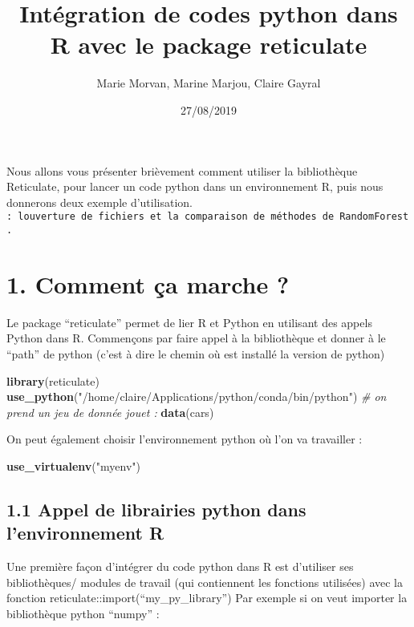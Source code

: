\documentclass[]{article}
\title{Intégration de codes python dans R avec le package reticulate}
\author{Marie Morvan, Marine Marjou, Claire Gayral}
\date{27/08/2019}
\newenvironment{Shaded}{\begin{snugshade}}{\end{snugshade}}
\newcommand{\CommentTok}[1]{\textcolor[rgb]{0.56,0.35,0.01}{\textit{#1}}}
\newcommand{\KeywordTok}[1]{\textcolor[rgb]{0.13,0.29,0.53}{\textbf{#1}}}
\newcommand{\NormalTok}[1]{#1}
\newcommand{\StringTok}[1]{\textcolor[rgb]{0.31,0.60,0.02}{#1}}
\begin{document}
\maketitle

Nous allons vous présenter brièvement comment utiliser la bibliothèque
Reticulate, pour lancer un code python dans un environnement R, puis
nous donnerons deux exemple d'utilisation.
\texttt{:\ l\textquotesingle{}ouverture\ de\ fichiers\ et\ la\ comparaison\ de\ méthodes\ de\ RandomForest.}

\hypertarget{comment-ca-marche}{%
\section{1. Comment ça marche ?}\label{comment-ca-marche}}

Le package ``reticulate'' permet de lier R et Python en utilisant des
appels Python dans R. Commençons par faire appel à la bibliothèque et
donner à le ``path'' de python (c'est à dire le chemin où est installé
la version de python)

\begin{Shaded}
\begin{Highlighting}[]
\KeywordTok{library}\NormalTok{(reticulate)}
\KeywordTok{use\_python}\NormalTok{(}\StringTok{"/home/claire/Applications/python/conda/bin/python"}\NormalTok{)}
\CommentTok{\# on prend un jeu de donnée jouet : }
\KeywordTok{data}\NormalTok{(cars)}
\end{Highlighting}
\end{Shaded}

On peut également choisir l'environnement python où l'on va travailler :

\begin{Shaded}
\begin{Highlighting}[]
\KeywordTok{use\_virtualenv}\NormalTok{(}\StringTok{"myenv"}\NormalTok{)}
\end{Highlighting}
\end{Shaded}

\hypertarget{appel-de-librairies-python-dans-lenvironnement-r}{%
\subsection{1.1 Appel de librairies python dans l'environnement
R}\label{appel-de-librairies-python-dans-lenvironnement-r}}

Une première façon d'intégrer du code python dans R est d'utiliser ses
bibliothèques/ modules de travail (qui contiennent les fonctions
utilisées) avec la fonction reticulate::import(``my\_py\_library'') Par
exemple si on veut importer la bibliothèque python ``numpy'' :
\end{document}
